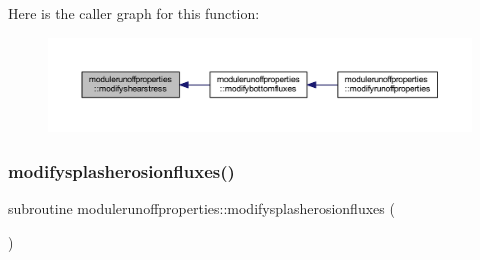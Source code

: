 Here is the caller graph for this function\+:\nopagebreak
\begin{figure}[H]
\begin{center}
\leavevmode
\includegraphics[width=350pt]{namespacemodulerunoffproperties_aab15f42e0b7672bdfdff651ff710415c_icgraph}
\end{center}
\end{figure}
\mbox{\label{namespacemodulerunoffproperties_a9ac3ca2c6f3cf83428d37c39365ba1ec}} 
\subsubsection{\texorpdfstring{modifysplasherosionfluxes()}{modifysplasherosionfluxes()}}
{\footnotesize\ttfamily subroutine modulerunoffproperties\+::modifysplasherosionfluxes (\begin{DoxyParamCaption}{ }\end{DoxyParamCaption})\hspace{0.3cm}{\ttfamily [private]}}

